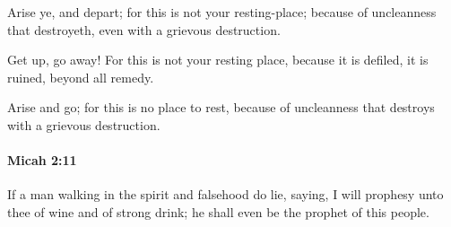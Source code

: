 			\begin{versebox}
					\item[BHS] 
					\item[LXX] 
					\item[ASV] Arise ye, and depart; for this is not your resting-place; because of uncleanness that destroyeth, even with a grievous destruction.
					\item[NIV] Get up, go away! For this is not your resting place, because it is defiled, it is ruined, beyond all remedy.
					\item[NRSV] Arise and go; for this is no place to rest, because of uncleanness that destroys with a grievous destruction.
			\end{versebox}

		\paragraph{Micah 2:11} %
			\label{MICAH-2-11}

			If a man walking in the spirit and falsehood do lie, saying, I will prophesy unto thee of wine and of strong drink; he shall even be the prophet of this people.


